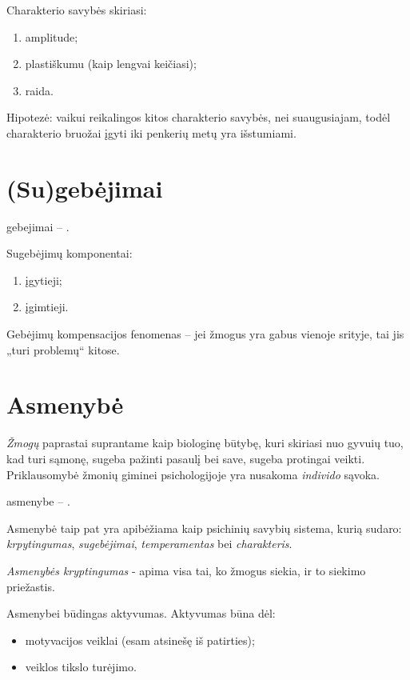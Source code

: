 Charakterio savybės skiriasi:

\begin{enumerate}
  \item amplitude;
  \item plastiškumu (kaip lengvai keičiasi);
  \item raida.
\end{enumerate}

Hipotezė: vaikui reikalingos kitos charakterio savybės, nei suaugusiajam,
todėl charakterio bruožai įgyti iki penkerių metų yra išstumiami.

\section{(Su)gebėjimai}

\Gls{gebejimai} – .

Sugebėjimų komponentai:

\begin{enumerate}
  \item įgytieji;
  \item įgimtieji.
\end{enumerate}

Gebėjimų kompensacijos fenomenas – jei žmogus yra gabus vienoje srityje, 
tai jis „turi problemų“ kitose.

\section{Asmenybė}

\label{tema:asmenybe}

\emph{Žmogų} paprastai suprantame kaip biologinę būtybę, kuri skiriasi nuo
gyvuių tuo, kad turi sąmonę, sugeba pažinti pasaulį bei save, sugeba 
protingai veikti. Priklausomybė žmonių giminei psichologijoje yra
nusakoma \emph{individo} sąvoka.

\Gls{asmenybe} – .

Asmenybė taip pat yra apibėžiama kaip psichinių savybių sistema, kurią
sudaro: \emph{krpytingumas}, \emph{sugebėjimai}, \emph{temperamentas} bei
\emph{charakteris}.

\emph{Asmenybės kryptingumas} - apima visa tai, ko žmogus siekia, ir to 
siekimo priežastis.

Asmenybei būdingas aktyvumas. Aktyvumas būna dėl:

\begin{itemize}
  \item motyvacijos veiklai (esam atsinešę iš patirties);
  \item veiklos tikslo turėjimo.
\end{itemize}


